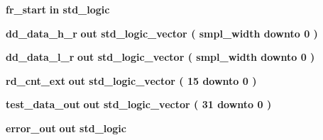 \begin{DoxyCompactItemize}
\item 
{\bf fr\+\_\+start}  {\bfseries {\bfseries \textcolor{keywordflow}{in}\textcolor{vhdlchar}{ }}} {\bfseries \textcolor{comment}{std\+\_\+logic}\textcolor{vhdlchar}{ }} 
\item 
{\bf dd\+\_\+data\+\_\+h\+\_\+r}  {\bfseries {\bfseries \textcolor{keywordflow}{out}\textcolor{vhdlchar}{ }}} {\bfseries \textcolor{comment}{std\+\_\+logic\+\_\+vector}\textcolor{vhdlchar}{ }\textcolor{vhdlchar}{(}\textcolor{vhdlchar}{ }\textcolor{vhdlchar}{ }\textcolor{vhdlchar}{ }\textcolor{vhdlchar}{ }{\bfseries {\bf smpl\+\_\+width}} \textcolor{vhdlchar}{ }\textcolor{keywordflow}{downto}\textcolor{vhdlchar}{ }\textcolor{vhdlchar}{ } \textcolor{vhdldigit}{0} \textcolor{vhdlchar}{ }\textcolor{vhdlchar}{)}\textcolor{vhdlchar}{ }} 
\item 
{\bf dd\+\_\+data\+\_\+l\+\_\+r}  {\bfseries {\bfseries \textcolor{keywordflow}{out}\textcolor{vhdlchar}{ }}} {\bfseries \textcolor{comment}{std\+\_\+logic\+\_\+vector}\textcolor{vhdlchar}{ }\textcolor{vhdlchar}{(}\textcolor{vhdlchar}{ }\textcolor{vhdlchar}{ }\textcolor{vhdlchar}{ }\textcolor{vhdlchar}{ }{\bfseries {\bf smpl\+\_\+width}} \textcolor{vhdlchar}{ }\textcolor{keywordflow}{downto}\textcolor{vhdlchar}{ }\textcolor{vhdlchar}{ } \textcolor{vhdldigit}{0} \textcolor{vhdlchar}{ }\textcolor{vhdlchar}{)}\textcolor{vhdlchar}{ }} 
\item 
{\bf rd\+\_\+cnt\+\_\+ext}  {\bfseries {\bfseries \textcolor{keywordflow}{out}\textcolor{vhdlchar}{ }}} {\bfseries \textcolor{comment}{std\+\_\+logic\+\_\+vector}\textcolor{vhdlchar}{ }\textcolor{vhdlchar}{(}\textcolor{vhdlchar}{ }\textcolor{vhdlchar}{ } \textcolor{vhdldigit}{15} \textcolor{vhdlchar}{ }\textcolor{keywordflow}{downto}\textcolor{vhdlchar}{ }\textcolor{vhdlchar}{ } \textcolor{vhdldigit}{0} \textcolor{vhdlchar}{ }\textcolor{vhdlchar}{)}\textcolor{vhdlchar}{ }} 
\item 
{\bf test\+\_\+data\+\_\+out}  {\bfseries {\bfseries \textcolor{keywordflow}{out}\textcolor{vhdlchar}{ }}} {\bfseries \textcolor{comment}{std\+\_\+logic\+\_\+vector}\textcolor{vhdlchar}{ }\textcolor{vhdlchar}{(}\textcolor{vhdlchar}{ }\textcolor{vhdlchar}{ } \textcolor{vhdldigit}{31} \textcolor{vhdlchar}{ }\textcolor{keywordflow}{downto}\textcolor{vhdlchar}{ }\textcolor{vhdlchar}{ } \textcolor{vhdldigit}{0} \textcolor{vhdlchar}{ }\textcolor{vhdlchar}{)}\textcolor{vhdlchar}{ }} 
\item 
{\bf error\+\_\+out}  {\bfseries {\bfseries \textcolor{keywordflow}{out}\textcolor{vhdlchar}{ }}} {\bfseries \textcolor{comment}{std\+\_\+logic}\textcolor{vhdlchar}{ }} 

\end{DoxyCompactItemize}
